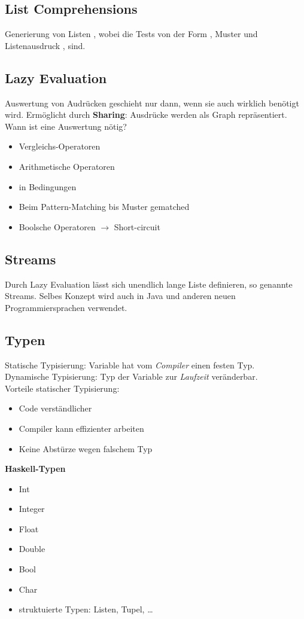 \subsection{List Comprehensions}%
\label{hsk:sub:list-comprehensions}
Generierung von Listen \code{\([e | q_1, ..., q_m]\)}, wobei die  Tests von der Form
, Muster  und Listenausdruck , sind.

\subsection{Lazy Evaluation}%
\label{hsk:sub:lazy-evaluation}
Auswertung von Audrücken geschieht nur dann, wenn sie auch wirklich benötigt wird. Ermöglicht durch \textbf{Sharing}:
Ausdrücke werden als Graph repräsentiert.\\

Wann ist eine Auswertung nötig?
\begin{itemize}
  \item Vergleichs-Operatoren
  \item Arithmetische Operatoren
  \item in Bedingungen
  \item Beim Pattern-Matching bis Muster gematched
  \item Boolsche Operatoren \(\rightarrow\) Short-circuit
\end{itemize}

\subsection{Streams}%
\label{hsk:sub:streams}
Durch Lazy Evaluation lässt sich unendlich lange Liste definieren, so genannte Streams.
Selbes Konzept wird auch in Java und anderen neuen Programmiersprachen verwendet.

\subsection{Typen}%
\label{hsk:sub:typen}
Statische Typisierung: Variable hat vom \textit{Compiler} einen festen Typ.\\
Dynamische Typisierung: Typ der Variable zur \textit{Laufzeit} veränderbar.\\
Vorteile statischer Typisierung:
\begin{itemize}
  \item Code verständlicher
  \item Compiler kann effizienter arbeiten
  \item Keine Abstürze wegen falschem Typ
\end{itemize}
\textbf{Haskell-Typen}
\begin{itemize}
  \item Int
  \item Integer
  \item Float
  \item Double
  \item Bool
  \item Char
  \item struktuierte Typen: Listen, Tupel, \ldots 
\end{itemize}

